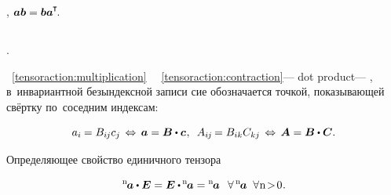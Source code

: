  , ${\bm{a} \bm{b} = \bm{b} \bm{a} ^{\hspace{-0.05em}\T}\hspace{-0.4ex}}$.


\subsection*{}

\begin{otherlanguage}{russian}

  .

 ~\eqref{tensoraction:multiplication} ~~\eqref{tensoraction:contraction}\:--- dot product\:--- , в~инвариантной безындексной записи сие обозначается точкой, показывающей свёртку по~соседним индексам:

\nopagebreak\vspace{-0.2em}\begin{equation}
a_i \hspace{-0.1ex} = B_{i\hspace{-0.1ex}j} c_j \,\Leftrightarrow\, \bm{a} = \bm{B} \dotp \bm{c} \hspace{.1ex}, \;\:
A_{i\hspace{-0.1ex}j} \hspace{-0.2ex} = B_{ik} C_{kj} \,\Leftrightarrow\, \bm{A} = \bm{B} \dotp \bm{C}.
\end{equation}

Определяющее свойство единичного тензора

\nopagebreak\vspace{-0.15em}\begin{equation}\label{identifyofidentitytensor}
{^\mathrm{n}\hspace{-0.2ex}\bm{a}} \dotp \UnitDyad = \UnitDyad \dotp \hspace{-0.15ex} {^\mathrm{n}\hspace{-0.2ex}\bm{a}} = {^\mathrm{n}\hspace{-0.2ex}\bm{a}} \;\:\:
\forall \, {^\mathrm{n}\hspace{-0.2ex}\bm{a}} \;\; \forall \hspace{.1ex} \mathrm{n \!>\! 0}
\hspace{.1ex}.
\end{equation}


\end{otherlanguage}
